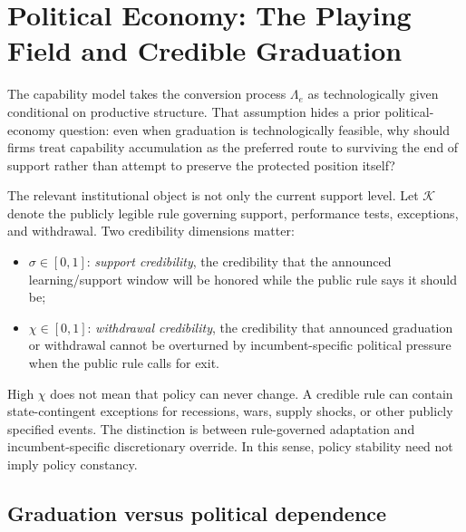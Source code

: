 \section{Political Economy: The Playing Field and Credible Graduation}
\label{sec:politics}

The capability model takes the conversion process $\Lambda_e$ as technologically given conditional on productive structure. That assumption hides a prior political-economy question: even when graduation is technologically feasible, why should firms treat capability accumulation as the preferred route to surviving the end of support rather than attempt to preserve the protected position itself?

The relevant institutional object is not only the current support level. Let $\mathcal K$ denote the publicly legible rule governing support, performance tests, exceptions, and withdrawal. Two credibility dimensions matter:
\begin{itemize}[leftmargin=*]
\item $\sigma\in[0,1]$: \emph{support credibility}, the credibility that the announced learning/support window will be honored while the public rule says it should be;
\item $\chi\in[0,1]$: \emph{withdrawal credibility}, the credibility that announced graduation or withdrawal cannot be overturned by incumbent-specific political pressure when the public rule calls for exit.
\end{itemize}
High $\chi$ does not mean that policy can never change. A credible rule can contain state-contingent exceptions for recessions, wars, supply shocks, or other publicly specified events. The distinction is between rule-governed adaptation and incumbent-specific discretionary override. In this sense, policy stability need not imply policy constancy.

\subsection{Graduation versus political dependence}

